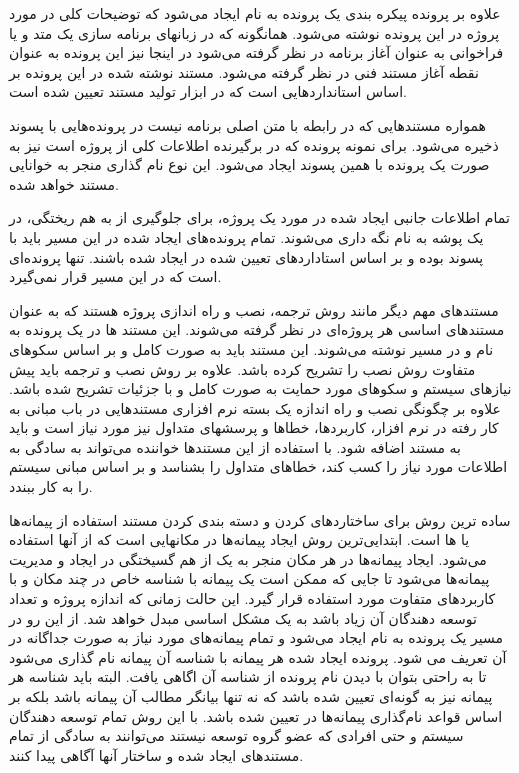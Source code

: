   علاوه بر پرونده پیکره بندی یک پرونده به نام  ایجاد می‌شود که
  توضیحات کلی در مورد پروژه در این پرونده نوشته می‌شود. همانگونه که در زبانهای
  برنامه سازی یک متد و یا فراخوانی به عنوان آغاز برنامه در نظر گرفته می‌شود در
  اینجا نیز این پرونده به عنوان نقطه آغاز مستند فنی در نظر گرفته می‌شود. مستند
  نوشته شده در این پرونده بر اساس استانداردهایی است که در ابزار تولید مستند
   تعیین شده است.

  همواره مستندهایی که در رابطه با متن اصلی برنامه نیست در پرونده‌هایی با پسوند
   ذخیره می‌شود. برای نمونه پرونده  که در برگیرنده
  اطلاعات کلی از پروژه است نیز به صورت یک پرونده با همین پسوند ایجاد
  می‌شود. این نوع نام گذاری منجر به خوانایی مستند خواهد شده.

  تمام اطلاعات جانبی ایجاد شده در مورد یک پروژه، برای جلوگیری از به هم ریختگی،
  در یک پوشه به نام  نگه داری می‌شوند. تمام پرونده‌های ایجاد شده در این
  مسیر باید با پسوند  بوده و بر اساس استاداردهای تعیین شده در
   ایجاد شده باشند.  تنها پرونده‌ای است که در این مسیر
  قرار نمی‌گیرد.
  
  مستندهای مهم دیگر مانند روش ترجمه، نصب و راه اندازی پروژه هستند که به عنوان 
مستندهای اساسی هر پروژه‌ای در نظر گرفته می‌شوند. این مستند ها در
  یک پرونده به نام  و در مسیر  نوشته می‌شوند.
 این مستند باید به صورت کامل و بر
  اساس سکوهای متفاوت روش نصب را تشریح کرده باشد. علاوه بر روش نصب و ترجمه باید
  پیش نیازهای سیستم و سکوهای مورد حمایت به صورت کامل و با
  جزئیات تشریح شده باشد. علاوه بر چگونگی نصب و راه اندازه یک بسته نرم افزاری
  مستندهایی در باب مبانی به کار رفته در نرم افزار، کاربردها، خطاها و پرسشهای
  متداول نیز مورد نیاز است و باید به مستند اضافه شود. با استفاده از این مستندها
  خواننده می‌تواند به سادگی به اطلاعات مورد نیاز را کسب کند، خطاهای متداول را بشناسد
  و بر اساس مبانی  سیستم را به کار ببندد.
  
  ساده ترین روش برای ساختاردهای کردن و دسته بندی کردن مستند استفاده از
  پیمانه‌ها یا ها است. ابتدایی‌ترین روش ایجاد پیمانه‌ها در مکانهایی است
  که از آنها استفاده می‌شود. ایجاد پیمانه‌ها در هر مکان منجر به یک از هم
  گسیختگی در ایجاد و مدیریت پیمانه‌ها می‌شود تا جایی که ممکن است یک پیمانه با
  شناسه خاص در چند مکان و با کاربردهای متفاوت مورد استفاده قرار گیرد. این حالت
  زمانی که اندازه پروژه و تعداد توسعه دهندگان آن زیاد باشد به یک مشکل اساسی
  مبدل خواهد شد. از این رو در مسیر  یک پرونده به نام  ایجاد
  می‌شود و تمام پیمانه‌های مورد نیاز به صورت جداگانه در آن تعریف می شود. پرونده
  ایجاد شده هر پیمانه با شناسه آن پیمانه نام گذاری می‌شود تا به راحتی بتوان با دیدن نام پرونده از
  شناسه آن اگاهی یافت. البته باید شناسه هر پیمانه نیز به گونه‌ای تعیین
  شده باشد که نه تنها بیانگر مطالب آن پیمانه باشد بلکه بر اساس قواعد نام‌گذاری 
پیمانه‌ها در  تعیین شده باشد. با این
  روش تمام توسعه دهندگان سیستم و حتی افرادی که عضو گروه توسعه نیستند
  می‌توانند به سادگی از تمام مستندهای ایجاد شده و ساختار آنها آگاهی پیدا کنند.
  
